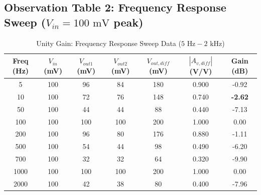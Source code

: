\documentclass[11pt,a4paper]{article}
\begin{document}
\subsection{Observation Table 2: Frequency Response Sweep ($V_{in} = 100\text{ mV}$ peak)}
\begin{table}[H]
\centering
\caption{Unity Gain: Frequency Response Sweep Data ($5\text{ Hz} - 2\text{ kHz}$)}
\label{tab:unity_freq}
\begin{tabular}{@{}ccccccc@{}}
\toprule
\textbf{Freq (Hz)} & \textbf{$V_{in}$ (mV)} & \textbf{$V_{out1}$ (mV)} & \textbf{$V_{out2}$ (mV)} & \textbf{$V_{out,diff}$ (mV)} & \textbf{$|A_{v,diff}|$ (V/V)} & \textbf{Gain (dB)} \\ \midrule
5    & 100 & 96  & 84  & 180 & 0.900 & -0.92 \\
10   & 100 & 72  & 76  & 148 & 0.740 & \textbf{-2.62} \\
50   & 100 & 44  & 44  & 88  & 0.440 & -7.13 \\
100  & 100 & 100 & 100 & 200 & 1.000 & 0.00 \\
200  & 100 & 96  & 80  & 176 & 0.880 & -1.11 \\
500  & 100 & 54  & 44  & 98  & 0.490 & -6.20 \\
700  & 100 & 32  & 32  & 64  & 0.320 & -9.90 \\
1000 & 100 & 100 & 100 & 200 & 1.000 & 0.00 \\
2000 & 100 & 42  & 38  & 80  & 0.400 & -7.96 \\ \bottomrule
\end{tabular}
\end{table}
\end{document}
